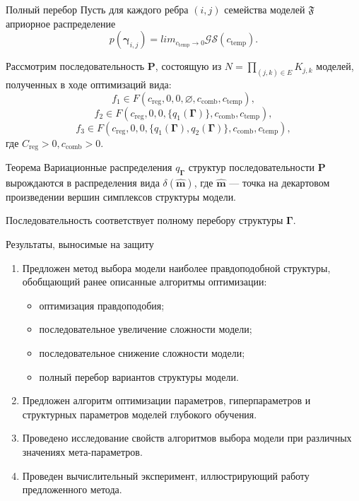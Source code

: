 \documentclass[usenames,dvipsnames,11pt,pdf,utf8,russian,aspectratio=43]{beamer}
\begin{document}
\begin{frame}{Полный перебор}
\small
Пусть для каждого ребра $(i,j)$ семейства моделей $\mathfrak{F}$ априорное распределение $$p(\boldsymbol{\gamma}_{i,j}) =  lim_{c_{\text{temp}} \to 0} \mathcal{GS}(c_{\text{temp}}).$$

Рассмотрим последовательность $\mathbf{P}$, состоящую из $N = \prod_{(j,k) \in E} K_{j,k}$ моделей, полученных в ходе оптимизаций вида:
$$f_1 \in F(c_{\text{reg}}, 0, 0, \varnothing, c_{\text{comb}},  c_{\text{temp}}),$$
$$f_2 \in F(c_{\text{reg}}, 0, 0, \{q_1(\boldsymbol{\Gamma})\},  c_{\text{comb}},  c_{\text{temp}}),$$
$$f_3 \in F(c_{\text{reg}}, 0, 0, \{q_1(\boldsymbol{\Gamma}), q_2(\boldsymbol{\Gamma})\},  c_{\text{comb}},  c_{\text{temp}}),$$
где $C_{\text{reg}} > 0,  c_{\text{comb}}>0$.


\begin{block}{Теорема}
Вариационные распределения $q_{\boldsymbol{\Gamma}}$ структур  последовательности $\mathbf{P}$ вырождаются в распределения вида $\delta(\hat{\mathbf{m}})$, где $\hat{\mathbf{m}}$ --- точка на декартовом произведении вершин симплексов структуры модели.

Последовательность соответствует полному перебору структуры $\boldsymbol{\Gamma}$.
\end{block}
\end{frame}


\begin{frame}{Результаты, выносимые на защиту}
\begin{enumerate}
\item Предложен метод выбора модели наиболее правдоподобной структуры, обобщающий ранее описанные алгоритмы оптимизации:
\begin{itemize}
\item оптимизация правдоподобия;
\item последовательное увеличение сложности модели;
\item последовательное снижение сложности модели;
\item полный перебор вариантов структуры модели.
\end{itemize}

\item Предложен алгоритм оптимизации параметров, гиперпараметров и структурных
параметров моделей глубокого обучения.

\item Проведено исследование свойств алгоритмов выбора модели при различных значениях мета-параметров.

\item Проведен вычислительный эксперимент, иллюстрирующий работу предложенного метода.

\end{enumerate}
\end{frame}
\end{document}
